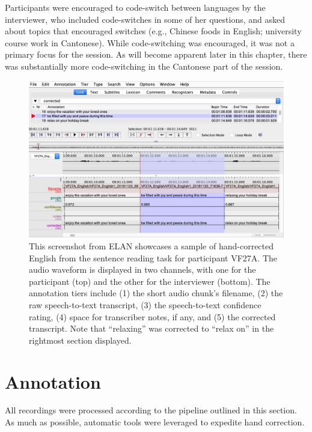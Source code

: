 Participants were encouraged to code-switch between languages by the interviewer, who included code-switches in some of her questions, and asked about topics that encouraged switches (e.g., Chinese foods in English; university course work in Cantonese). While code-switching was encouraged, it was not a primary focus for the session. As will become apparent later in this chapter, there was substantially more code-switching in the Cantonese part of the session.

\begin{figure}[ht]
\begin{center}
\includegraphics[width=5in]{figures/ch2_elan.png} 
\caption{This screenshot from ELAN showcases a sample of hand-corrected English from the sentence reading task for participant VF27A. The audio waveform is displayed in two channels, with one for the participant (top) and the other for the interviewer (bottom). The annotation tiers include (1) the short audio chunk's filename, (2) the raw speech-to-text transcript, (3) the speech-to-text confidence rating, (4) space for transcriber notes, if any, and (5) the corrected transcript. Note that ``relaxing'' was corrected to ``relax on'' in the rightmost section displayed.}
\label{ch2:fig:elan}
\end{center}
\end{figure}

\section{Annotation}\label{ch2:sec:annotation}
All recordings were processed according to the pipeline outlined in this section. As much as possible, automatic tools were leveraged to expedite hand correction. 


